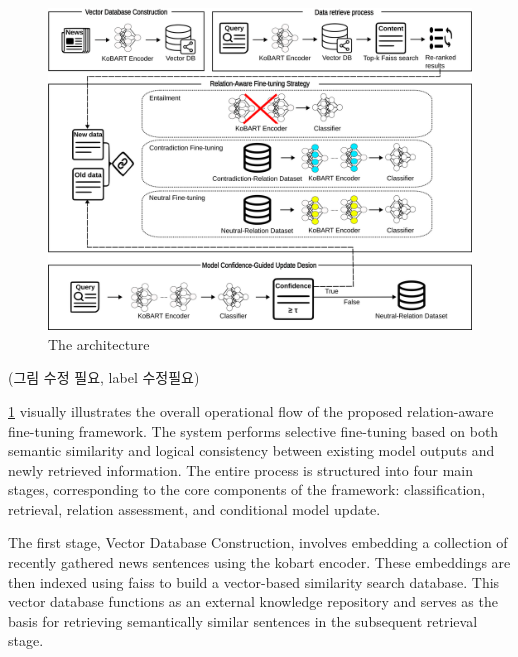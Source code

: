 \documentclass[a4paper,fleqn]{cas-sc}
\begin{document}
\begin{figure}[htbp]
    \centering
    \includegraphics[width=\textwidth]{architecture.png}
    \caption{The architecture}
    \label{Fig.: architecture}
\end{figure}

(그림 수정 필요, label 수정필요)

\cref{Fig.: architecture} visually illustrates the overall operational flow of the proposed relation-aware fine-tuning framework. The system performs selective fine-tuning based on both semantic similarity and logical consistency between existing model outputs and newly retrieved information. The entire process is structured into four main stages, corresponding to the core components of the framework: classification, retrieval, relation assessment, and conditional model update.

The first stage, Vector Database Construction, involves embedding a collection of recently gathered news sentences using the \gls{kobart} encoder. These embeddings are then indexed using \gls{faiss} to build a vector-based similarity search database. This vector database functions as an external knowledge repository and serves as the basis for retrieving semantically similar sentences in the subsequent retrieval stage.
\end{document}
